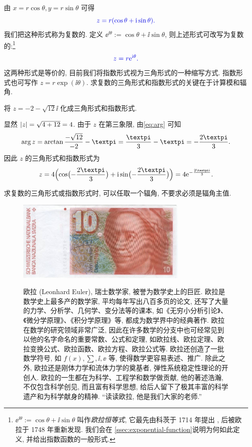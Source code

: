 由 $x=r\cos\theta,y=r\sin\theta$ 可得
\[
  \color{main}z=r(\cos\theta+\ii\sin\theta).
\]
我们把这种形式称为复数的.
定义 \alert{$\ee^{\ii\theta}:=\cos\theta+\ii\sin\theta$}, 则上述形式可改写为复数的:\footnote{%
  $\ee^{\ii\theta}:=\cos\theta+\ii\sin\theta$ 叫作\emph{欧拉恒等式}, 它最先由科茨于 1714 年提出 \cite[第19章3节]{Kline1990b}, 后被欧拉于 1748 年重新发现.
  我们会在 \ref{ssec:exponential-function}说明为何如此定义, 并给出指数函数的一般形式.
}
\[
  \color{main}z=r\ee^{\ii\theta}.
\]
这两种形式是等价的, 目前我们将指数形式视为三角形式的一种缩写方式.
指数形式也可写作 $z=r\exp(\ii\theta)$.
求复数的三角形式和指数形式的\alert{关键在于计算模和辐角}.

\begin{example}
  将 $z=-2-\sqrt{12}\ii$ 化成三角形式和指数形式.
\end{example}

\begin{solution}
  显然 $\lvert z\rvert=\sqrt{4+12}=4$.
  由于 $z$ 在第三象限, 由\eqref{eq:arg} 可知
  \[
     \arg z
    =\arctan\frac{-\sqrt{12}}{-2}-\cpi
    =\frac\cpi3-\cpi
    =-\frac{2\cpi}3.
  \]
  因此 $z$ 的三角形式和指数形式为
  \[
     z
    =4\Bigl(\cos\bigl(-\frac{2\cpi}3\bigr)+\ii\sin\bigl(-\frac{2\cpi}3\bigr)\Bigr)
    =4\ee^{-\frac{2\cpi \ii}3}.
  \]
\end{solution}

求复数的三角形式或指数形式时, 可以任取一个辐角, 不要求必须是辐角主值.

\begin{figure}[H]
  \begin{peoplebox}
    \begin{center}
      \includegraphics*[height=4cm]{images/Euler.jpg}
    \end{center}
    欧拉 (Leonhard Euler), 瑞士数学家, 被誉为数学史上的巨匠.
    欧拉是数学史上最多产的数学家, 平均每年写出八百多页的论文, 还写了大量的力学、分析学、几何学、变分法等的课本, 如《无穷小分析引论》、《微分学原理》、《积分学原理》等, 都成为数学界中的经典著作.
    欧拉在数学的研究领域非常广泛, 因此在许多数学的分支中也可经常见到以他的名字命名的重要常数、公式和定理, 如欧拉线、欧拉定理、欧拉变换公式、欧拉函数、欧拉方程、欧拉公式等.
    欧拉还创造了一批数学符号, 如 $f(x), \sum,\ii,\ee$ 等, 使得数学更容易表述、推广.
    除此之外, 欧拉还是刚体力学和流体力学的奠基者, 弹性系统稳定性理论的开创人.
    欧拉的一生都在为科学、工程学和数学做贡献, 他的著述浩瀚, 不仅包含科学创见, 而且富有科学思想, 给后人留下了极其丰富的科学遗产和为科学献身的精神. ``读读欧拉, 他是我们大家的老师.''
  \end{peoplebox}
\end{figure}

